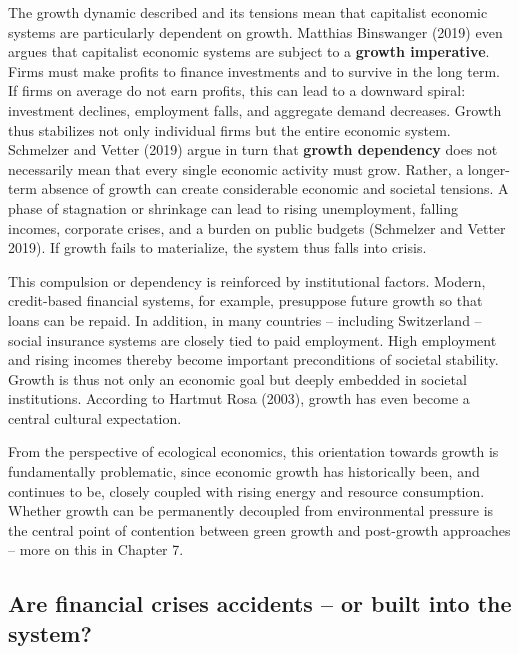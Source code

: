 \documentclass[
  british,
  a4paper,
  DIV=11,
  numbers=noendperiod,
  oneside,
  openany]{scrreprt}
\begin{document}
The growth dynamic described and its tensions mean that capitalist
economic systems are particularly dependent on growth. Matthias
Binswanger (2019) even argues that capitalist economic systems are
subject to a \textbf{growth imperative}. Firms must make profits to
finance investments and to survive in the long term. If firms on average
do not earn profits, this can lead to a downward spiral: investment
declines, employment falls, and aggregate demand decreases. Growth thus
stabilizes not only individual firms but the entire economic system.
Schmelzer and Vetter (2019) argue in turn that \textbf{growth
dependency} does not necessarily mean that every single economic
activity must grow. Rather, a longer-term absence of growth can create
considerable economic and societal tensions. A phase of stagnation or
shrinkage can lead to rising unemployment, falling incomes, corporate
crises, and a burden on public budgets (Schmelzer and Vetter 2019). If
growth fails to materialize, the system thus falls into crisis.

This compulsion or dependency is reinforced by institutional factors.
Modern, credit-based financial systems, for example, presuppose future
growth so that loans can be repaid. In addition, in many countries --
including Switzerland -- social insurance systems are closely tied to
paid employment. High employment and rising incomes thereby become
important preconditions of societal stability. Growth is thus not only
an economic goal but deeply embedded in societal institutions. According
to Hartmut Rosa (2003), growth has even become a central cultural
expectation.

From the perspective of ecological economics, this orientation towards
growth is fundamentally problematic, since economic growth has
historically been, and continues to be, closely coupled with rising
energy and resource consumption. Whether growth can be permanently
decoupled from environmental pressure is the central point of contention
between green growth and post-growth approaches -- more on this in
Chapter 7.

\subsection{Are financial crises accidents -- or built into the
system?}\label{are-financial-crises-accidents-or-built-into-the-system}
\end{document}
